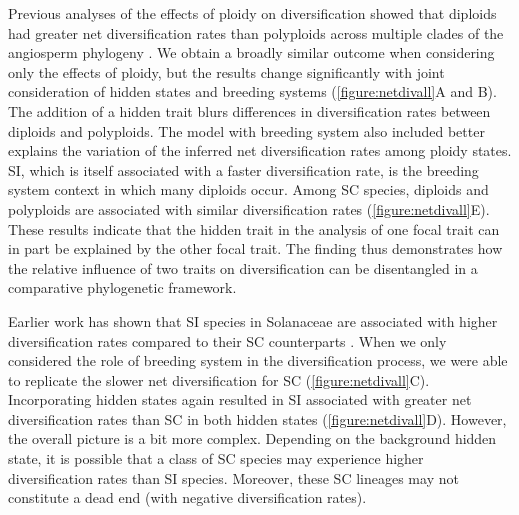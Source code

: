 Previous analyses of the effects of ploidy on diversification showed that diploids had greater net diversification rates than polyploids across multiple clades of the angiosperm phylogeny \citep{mayrose_2011, mayrose_2015}. 
We obtain a broadly similar outcome when considering only the effects of ploidy, but the results change significantly with joint consideration of hidden states and breeding systems (\cref{figure:netdivall}A and B). 
The addition of a hidden trait blurs differences in diversification rates between diploids and polyploids.
The model with breeding system also included better explains the variation of the inferred net diversification rates among ploidy states. 
SI, which is itself associated with a faster diversification rate, is the breeding system context in which many diploids occur.
Among SC species, diploids and polyploids are associated with similar diversification rates (\cref{figure:netdivall}E).
These results indicate that the hidden trait in the analysis of one focal trait can in part be explained by the other focal trait.
The finding thus demonstrates how the relative influence of two traits on diversification can be disentangled in a comparative phylogenetic framework.

Earlier work has shown that SI species in Solanaceae are associated with higher diversification rates compared to their SC counterparts \citep{goldberg_2010}. 
When we only considered the role of breeding system in the diversification process, we were able to replicate the slower net diversification for SC  (\cref{figure:netdivall}C).  %
Incorporating hidden states again resulted in SI associated with greater net diversification rates than SC in both hidden states  (\cref{figure:netdivall}D). 
However, the overall picture is a bit more complex.
Depending on the background hidden state, it is possible that a class of SC species may experience higher diversification rates than SI species.
Moreover, these SC lineages may not constitute a dead end (with negative diversification rates).




